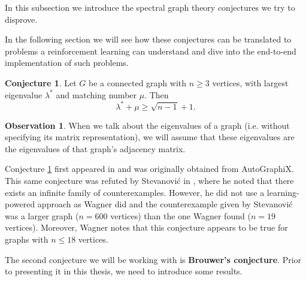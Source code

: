 \documentclass[11pt]{article}
\theoremstyle{definition}
\newtheorem{prop}{Proposition}
\newtheorem{conj}{Conjecture}
\newtheorem*{obs}{Observation}
\begin{document}
In this subsection we introduce the spectral graph theory conjectures we try to disprove.

In the following section we will see how these conjectures can be translated to problems a reinforcement learning can understand and dive into the end-to-end implementation of such problems. 

\begin{conj}\label{wagner}
    Let $G$ be a connected graph with $n \geq 3$ vertices, with largest eigenvalue $\lambda^*$ and matching number $\mu$. Then 
    \begin{equation*}
        \lambda^* + \mu \geq \sqrt{n-1} + 1.
    \end{equation*}
\end{conj}

\begin{obs}
    When we talk about the eigenvalues of a graph (i.e. without specifying its matrix representation), we will assume that these eigenvalues are the eigenvalues of that graph's adjacency matrix. 
\end{obs}

Conjecture \ref{wagner} first appeared in \cite{zbMATH05689445} and was originally obtained from AutoGraphiX. This same conjecture was refuted by Stevanović in \cite{zbMATH05804421}, where he noted that there exists an infinite family of counterexamples. However, he did not use a learning-powered approach as Wagner did and the counterexample given by Stevanović was a larger graph ($n = 600$ vertices) than the one Wagner found ($n = 19$ vertices). Moreover, Wagner notes that this conjecture appears to be true for graphs with $n \leq 18$ vertices.

The second conjecture we will be working with is \textbf{Brouwer's conjecture}. Prior to presenting it in this thesis, we need to introduce some results.


\end{document}
